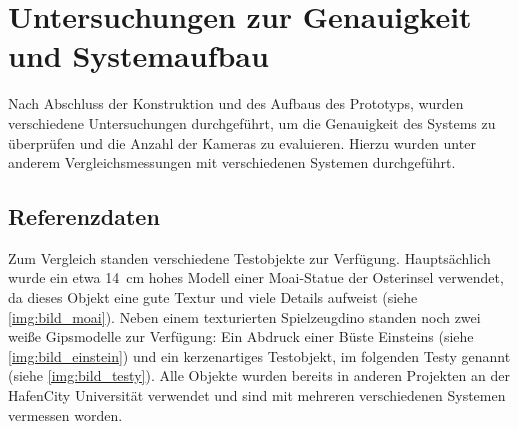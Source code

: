 \documentclass[./00PhotoBox.tex]{subfiles}
\begin{document}
\chapter{Untersuchungen zur Genauigkeit und Systemaufbau}
\label{c:versuche}
Nach Abschluss der Konstruktion und des Aufbaus des Prototyps, wurden verschiedene Untersuchungen durchgeführt, um die Genauigkeit des Systems zu überprüfen und die Anzahl der Kameras zu evaluieren. Hierzu wurden unter anderem Vergleichsmessungen mit verschiedenen Systemen durchgeführt.

\section{Referenzdaten}
\label{s:referenzdaten}
Zum Vergleich standen verschiedene Testobjekte zur Verfügung. Hauptsächlich wurde ein etwa \SI{14}{\centi\metre} hohes Modell einer Moai-Statue der Osterinsel verwendet, da dieses Objekt eine gute Textur und viele Details aufweist (siehe \autoref{img:bild_moai}). Neben einem texturierten Spielzeugdino standen noch zwei weiße Gipsmodelle zur Verfügung: Ein Abdruck einer Büste Einsteins  (siehe \autoref{img:bild_einstein}) und ein kerzenartiges Testobjekt, im folgenden Testy genannt (siehe \autoref{img:bild_testy}). Alle Objekte wurden bereits in anderen Projekten an der HafenCity Universität verwendet \citep[vgl. z.\,B.][]{kersten_scanner} und sind mit mehreren verschiedenen Systemen vermessen worden.
\end{document}
